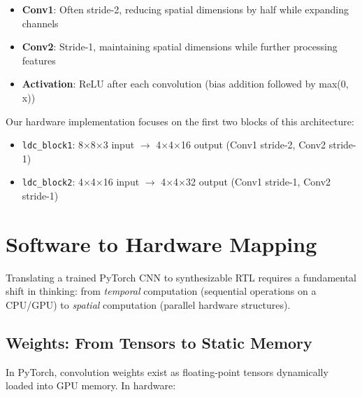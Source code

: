 \documentclass[11pt,a4paper]{report}
\begin{document}
\begin{itemize}[leftmargin=2em]
    \item \textbf{Conv1}: Often stride-2, reducing spatial dimensions by half while expanding channels
    \item \textbf{Conv2}: Stride-1, maintaining spatial dimensions while further processing features
    \item \textbf{Activation}: ReLU after each convolution (bias addition followed by max(0, x))
\end{itemize}

Our hardware implementation focuses on the first two blocks of this architecture:
\begin{itemize}[leftmargin=2em]
    \item \texttt{ldc\_block1}: 8$\times$8$\times$3 input $\rightarrow$ 4$\times$4$\times$16 output (Conv1 stride-2, Conv2 stride-1)
    \item \texttt{ldc\_block2}: 4$\times$4$\times$16 input $\rightarrow$ 4$\times$4$\times$32 output (Conv1 stride-1, Conv2 stride-1)
\end{itemize}


\section{Software to Hardware Mapping}

Translating a trained PyTorch CNN to synthesizable RTL requires a fundamental shift in thinking: from \textit{temporal} computation (sequential operations on a CPU/GPU) to \textit{spatial} computation (parallel hardware structures).

\subsection{Weights: From Tensors to Static Memory}

In PyTorch, convolution weights exist as floating-point tensors dynamically loaded into GPU memory. In hardware:
\end{document}
